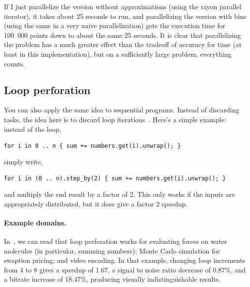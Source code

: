 If I just parallelize the version without approximations (using the rayon parallel iterator), it takes about 25 seconds to run, and parallelizing the version with bins (using the same in a very naive parallelization) gets the execution time for 100~000 points down to about the same 25 seconds. It is clear that parallelizing the problem has a much greater effect than the tradeoff of accuracy for time (at least in this implementation), but on a sufficiently large problem, everything counts.


\subsection*{Loop perforation} 
You can also apply the same idea to sequential programs. Instead
of discarding tasks, the idea here is to discard loop iterations~\cite{hoffmann09:_using_code_perfor_improv_perfor}.
Here's a simple example: instead of the loop,
\begin{center}
\verb|for i in 0 .. n { sum += numbers.get(i).unwrap(); }|
\end{center} \vspace*{-1em}
simply write,
\vspace*{-1em}\begin{center}
\verb|for i in (0 .. n).step_by(2) { sum += numbers.get(i).unwrap(); }|
\end{center}
and multiply the end result by a factor of 2. This only works 
if the inputs are appropriately distributed, but it does give a
factor 2 speedup.

\paragraph{Example domains.} In~\cite{Rinard:2010:PSA:1932682.1869525},
we can read that loop perforation works for evaluating forces on water
molecules (in particular, summing numbers); Monte Carlo simulation for
swaption pricing; and video encoding. In that example, changing loop
increments from 4 to 8 gives a speedup of 1.67, a signal to noise ratio
decrease of $0.87\%$, and a bitrate increase of $18.47\%$, producing
visually indistinguishable results. 





